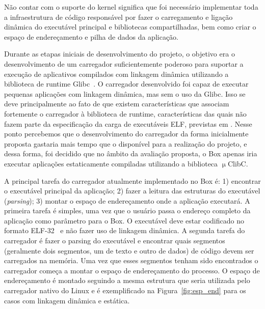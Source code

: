 \documentclass[11pt,twoside]{article}
\begin{document}
Não contar com o suporte do kernel significa que foi necessário implementar toda
a infraestrutura de código responsável por fazer o carregamento e ligação
dinâmica do executável principal e bibliotecas compartilhadas, bem como criar o
espaço de endereçamento e pilha de dados da aplicação.

Durante as etapas iniciais de desenvolvimento do projeto, o objetivo era o
desenvolvimento de um carregador suficientemente poderoso para suportar a
execução de aplicativos compilados com linkagem dinâmica utilizando a biblioteca
de runtime Glibc~\cite{glibc}. O carregador desenvolvido foi capaz de executar
pequenas aplicações com linkagem dinâmica, mas sem o uso da Glibc. Isso se deve
principalmente ao fato de que existem características que associam fortemente o
carregador à biblioteca de runtime, características das quais não fazem parte da
especificação da carga de executáveis ELF, previstas em \cite{SCO1997}.  Nesse
ponto percebemos que o desenvolvimento do carregador da forma inicialmente
proposta gastaria mais tempo que o disponível para a realização do projeto, e
dessa forma, foi decidido que no âmbito da avaliação proposta, o Box apenas iria
executar aplicações estaticamente compiladas utilizando a biblioteca
$\upmu$ClibC.

A principal tarefa do carregador atualmente implementado no Box é: 1) encontrar
o executável principal da aplicação; 2) fazer a leitura das estruturas do
executável (\emph{parsing}); 3) montar o espaço de endereçamento onde a
aplicação executará. A primeira tarefa é simples, uma vez que o usuário passa o
endereço completo da aplicação como parâmetro para o Box. O executável deve
estar codificado no formato ELF-32~\cite{SCO1997} e não fazer uso de linkagem
dinâmica. A segunda tarefa do carregador é fazer o parsing do executável e
encontrar quais segmentos (geralmente dois segmentos, um de texto e outro de
dados) de código devem ser carregados na memória. Uma vez que esses segmentos
tenham sido encontrados o carregador começa a montar o espaço de endereçamento
do processo. O espaço de endereçamento é montado seguindo a mesma estrutura que
seria utilizada pelo carregador nativo do Linux e é exemplificado na
Figura~\ref{fig:esp_end} para os casos com linkagem dinâmica e estática.
\end{document}
